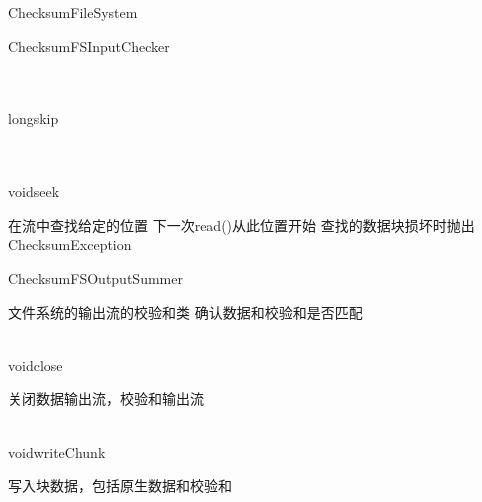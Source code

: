 \begin{XeClass}{ChecksumFileSystem}
\begin{XeInnerClass}{ChecksumFSInputChecker}
\begin{XeMethod}{\XePublic\\ \XeSync\\ }{long}{skip}
    \end{XeMethod}

    \begin{XeMethod}{\XePublic\\ \XeSync\\ }{void}{seek}
         
 在流中查找给定的位置
 下一次read()从此位置开始
 查找的数据块损坏时抛出ChecksumException 

    \end{XeMethod}

  \end{XeInnerClass}
  \begin{XeInnerClass}{ChecksumFSOutputSummer}
     
 文件系统的输出流的校验和类
 确认数据和校验和是否匹配

    \begin{XeMethod}{\XePublic\\ }{void}{close}
         
 关闭数据输出流，校验和输出流

    \end{XeMethod}

    \begin{XeMethod}{\XeProtected\\ }{void}{writeChunk}
         
 写入块数据，包括原生数据和校验和

    \end{XeMethod}

  \end{XeInnerClass}
\end{XeClass}
